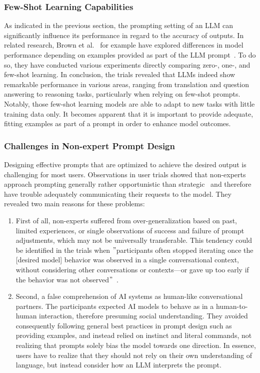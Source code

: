 \subsubsection{Few-Shot Learning Capabilities}
As indicated in the previous section, the prompting setting of an LLM can significantly influence its
performance in regard to the accuracy of outputs.
In related research, Brown et al\(.\)~\cite{brown_language_2020} for example have explored differences
in model performance depending on examples provided as part of the LLM prompt~\cite{brown_language_2020}.
To do so, they have conducted various experiments directly comparing zero-, one-, and few-shot learning.
In conclusion, the trials revealed that LLMs indeed show remarkable performance in various areas,
ranging from translation and question answering to reasoning tasks, particularly when relying on few-shot
prompts.
Notably, those few-shot learning models are able to adapt to new tasks with little training data only.
It becomes apparent that it is important to provide adequate, fitting examples as part of a prompt in order
to enhance model outcomes.

\subsubsection{Challenges in Non-expert Prompt Design}
Designing effective prompts that are optimized to achieve the desired output is challenging for
most users.
Observations in user trials showed that non-experts approach prompting generally rather
opportunistic than strategic~\cite{zamfirescu-pereira_why_2023} and therefore have trouble
adequately communicating their requests to the model.
They revealed two main reasons for these problems:
\begin{enumerate}
    \item First of all, non-experts suffered from over-generalization based on past, limited experiences,
    or single observations of success and failure of prompt adjustments, which may not be universally
    transferable. %
    This tendency could be identified in the trials when \("\)participants often stopped iterating
    once the [desired model] behavior was observed in a single conversational context,
    without considering other conversations or contexts—or gave up too early
    if the behavior was not observed\("\)~\cite[p. 10]{zamfirescu-pereira_why_2023}.
    \item Second, a false comprehension of AI systems as human-like conversational partners.
    The participants expected AI models to behave as in a human-to-human interaction,
    therefore presuming social understanding.
    They avoided consequently following general best practices in prompt design such as providing
    examples, and instead relied on instinct and literal commands, not realizing that prompts
    solely bias the model towards one direction.
    In essence, users have to realize that they should not rely on their own understanding of
    language, but instead consider how an LLM interprets the prompt.
\end{enumerate}

